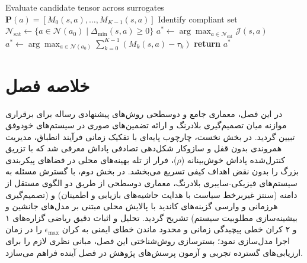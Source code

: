 \documentclass[oneside,openany,phd]{TMU-Thesis}
\begin{document}
\begin{algorithm}[H]
\begin{latin}
\begin{algorithmic}[1]
\STATE Evaluate candidate tensor across surrogates $\mathbf{P}(a) = [M_0(s, a), \dots, M_{K-1}(s, a)]$
\STATE Identify compliant set $\mathcal{N}_{\text{sat}} \leftarrow \{a \in \mathcal{N}(a_0) \mid \Delta_{\min}(s, a) \ge 0\}$
  \STATE $a^* \leftarrow \arg\max_{a \in \mathcal{N}_{\text{sat}}} \mathcal{J}(s, a)$ 
\ELSE
  \STATE $a^* \leftarrow \arg\max_{a \in \mathcal{N}(a_0)} \sum_{k=0}^{K-1} (M_k(s, a) - \tau_k)$ 
\ENDIF
\STATE \textbf{return} $a^*$ 
\end{algorithmic}
\end{latin}
\end{algorithm}

\clearpage
\section{خلاصه فصل}
\label{sec:ch4_summary_final}

در این فصل، معماری جامع و دوسطحی روش‌های پیشنهادی رساله برای برقراری موازنه میان تصمیم‌گیری بلادرنگ و ارائه تضمین‌های صوری در سیستم‌های خودوفق تبیین گردید. در بخش نخست، چارچوب پایه‌ای  با تفکیک زمانی فرآیند انطباق، مدیریت همروندی بدون قفل و سازوکار شکل‌دهی تصادفی پاداش معرفی شد که با تزریق کنترل‌شده پاداش خوش‌بینانه ($\rho$)، فرار از تله بهینه‌های محلی در فضاهای پیکربندی بزرگ را بدون نقض اهداف کیفی تسریع می‌بخشد. در بخش دوم، با گسترش مسئله به سیستم‌های فیزیکی-سایبری بلادرنگ، معماری دوسطحی \rsdrlplus از طریق دو الگوی مستقل از دامنه \sgos (سنتز غیربرخط سیاست با هدایت حاشیه‌های بازیابی و اطمینان) و \caepv (تصمیم‌گیری هرزمانی و وارسی گزینه‌های کاندید با پالایش محلی مبتنی بر مدل‌های جانشین و بیشینه‌سازی مطلوبیت سیستم) تشریح گردید. تحلیل و اثبات دقیق ریاضی گزاره‌های ۱ و ۲ کران خطی پیچیدگی زمانی و محدود ماندن خطای ایمنی به کران $\epsilon_{\max}$ را در زمان اجرا مدل‌سازی نمود؛ بسترسازی روش‌شناختی این فصل، مبانی نظری لازم را برای ارزیابی‌های گسترده تجربی و آزمون پرسش‌های پژوهش در فصل آینده فراهم می‌سازد.
\newpage




\ifstandalone


\fi
\end{document}
